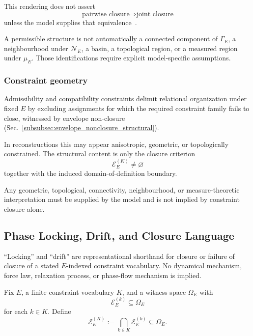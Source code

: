 \documentclass[aps,prx,onecolumn,11pt]{revtex4-2}
\theoremstyle{plain}
\theoremstyle{definition}
\theoremstyle{remark}
\begin{document}
This rendering does not assert
\[
\text{pairwise closure}
\Longrightarrow
\text{joint closure}
\]
unless the model supplies that equivalence~\cite{Dechter2003,Diestel2017}.

A permissible structure is not automatically a connected component of
\(\Gamma_E\), a neighbourhood under \(\mathcal N_E\), a basin, a
topological region, or a measured region under \(\mu_E\). Those
identifications require explicit model-specific assumptions.

\subsubsection{Constraint geometry}
\label{subsubsec:constraint_geometry_compat_struct}

Admissibility and compatibility constraints delimit relational
organization under fixed \(E\) by excluding assignments for which the
required constraint family fails to close, witnessed by envelope
non-closure
(Sec.~\ref{subsubsec:envelope_nonclosure_structural}).

In reconstructions this may appear anisotropic, geometric, or
topologically constrained. The structural content is only the closure
criterion
\[
\mathcal{E}^{(K)}_E\neq\varnothing
\]
together with the induced domain-of-definition boundary.

Any geometric, topological, connectivity, neighbourhood, or
measure-theoretic interpretation must be supplied by the model and is
not implied by constraint closure alone.

\subsection{Phase Locking, Drift, and Closure Language}
\label{subsec:phase_locking_drift_struct}

``Locking'' and ``drift'' are representational shorthand for closure or
failure of closure of a stated \(E\)-indexed constraint vocabulary. No
dynamical mechanism, force law, relaxation process, or phase-flow
mechanism is implied.

Fix \(E\), a finite constraint vocabulary \(K\), and a witness space
\(\Omega_E\) with
\[
\mathcal{E}^{(k)}_E\subseteq\Omega_E
\]
for each \(k\in K\). Define
\begin{equation}
\mathcal{E}^{(K)}_E
:=
\bigcap_{k\in K}
\mathcal{E}^{(k)}_E
\subseteq
\Omega_E.
\label{eq:locking_intersection_envelope}
\end{equation}
\end{document}
